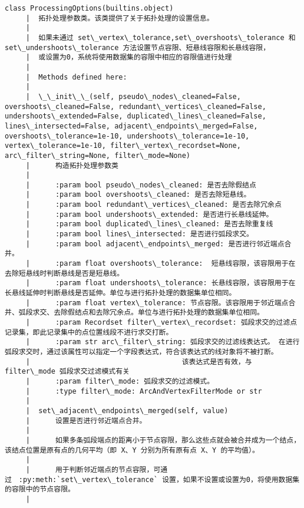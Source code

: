 \documentclass[11pt]{article}
\begin{document}
\begin{Verbatim}[commandchars=\\\{\}]
    class ProcessingOptions(builtins.object)
     |  拓扑处理参数类。该类提供了关于拓扑处理的设置信息。
     |  
     |  如果未通过 set\_vertex\_tolerance,set\_overshoots\_tolerance 和 set\_undershoots\_tolerance 方法设置节点容限、短悬线容限和长悬线容限，
     |  或设置为0，系统将使用数据集的容限中相应的容限值进行处理
     |  
     |  Methods defined here:
     |  
     |  \_\_init\_\_(self, pseudo\_nodes\_cleaned=False, overshoots\_cleaned=False, redundant\_vertices\_cleaned=False, undershoots\_extended=False, duplicated\_lines\_cleaned=False, lines\_intersected=False, adjacent\_endpoints\_merged=False, overshoots\_tolerance=1e-10, undershoots\_tolerance=1e-10, vertex\_tolerance=1e-10, filter\_vertex\_recordset=None, arc\_filter\_string=None, filter\_mode=None)
     |      构造拓扑处理参数类
     |      
     |      :param bool pseudo\_nodes\_cleaned: 是否去除假结点
     |      :param bool overshoots\_cleaned: 是否去除短悬线。
     |      :param bool redundant\_vertices\_cleaned: 是否去除冗余点
     |      :param bool undershoots\_extended: 是否进行长悬线延伸。
     |      :param bool duplicated\_lines\_cleaned: 是否去除重复线
     |      :param bool lines\_intersected: 是否进行弧段求交。
     |      :param bool adjacent\_endpoints\_merged: 是否进行邻近端点合并。
     |      :param float overshoots\_tolerance:  短悬线容限，该容限用于在去除短悬线时判断悬线是否是短悬线。
     |      :param float undershoots\_tolerance: 长悬线容限，该容限用于在长悬线延伸时判断悬线是否延伸。单位与进行拓扑处理的数据集单位相同。
     |      :param float vertex\_tolerance: 节点容限。该容限用于邻近端点合并、弧段求交、去除假结点和去除冗余点。单位与进行拓扑处理的数据集单位相同。
     |      :param Recordset filter\_vertex\_recordset: 弧段求交的过滤点记录集，即此记录集中的点位置线段不进行求交打断。
     |      :param str arc\_filter\_string: 弧段求交的过滤线表达式。 在进行弧段求交时，通过该属性可以指定一个字段表达式，符合该表达式的线对象将不被打断。
     |                                    该表达式是否有效，与 filter\_mode 弧段求交过滤模式有关
     |      :param filter\_mode: 弧段求交的过滤模式。
     |      :type filter\_mode: ArcAndVertexFilterMode or str
     |  
     |  set\_adjacent\_endpoints\_merged(self, value)
     |      设置是否进行邻近端点合并。
     |      
     |      如果多条弧段端点的距离小于节点容限，那么这些点就会被合并成为一个结点，该结点位置是原有点的几何平均（即 X、Y 分别为所有原有点 X、Y 的平均值）。
     |      
     |      用于判断邻近端点的节点容限，可通过　:py:meth:`set\_vertex\_tolerance` 设置，如果不设置或设置为0，将使用数据集的容限中的节点容限。
     |      

\end{Verbatim}
\end{document}
